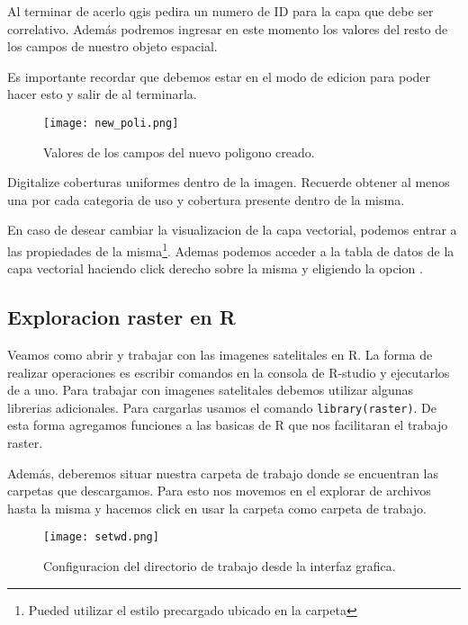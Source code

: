 Al terminar de acerlo qgis pedira un numero de ID para la capa que debe ser
correlativo. Además podremos ingresar en este momento los valores del resto de
los campos de nuestro objeto espacial.

Es importante recordar que debemos estar en el modo de edicion para poder hacer
esto y salir de al terminarla.

\begin{figure}[h!]
\begin{center}
    \texttt{[image: new\_poli.png]}
\end{center}
    \caption{Valores de los campos del nuevo poligono creado.}
    \label{fig:newpoli}
\end{figure}

\begin{act}
   Digitalize coberturas uniformes dentro de la imagen. Recuerde obtener al
   menos una por cada categoria de uso y cobertura presente dentro de la misma.
\end{act}

En caso de desear cambiar la visualizacion de la capa vectorial, podemos entrar
a las propiedades de la misma\footnote{Pueded utilizar el estilo precargado
ubicado en la carpeta }. Ademas podemos acceder a la tabla de
datos de la capa vectorial haciendo click derecho sobre la misma y eligiendo la
opcion .

\subsection{Exploracion raster en R}
Veamos como abrir y trabajar con las imagenes satelitales en R. La forma de
realizar operaciones es escribir comandos en la consola de R-studio y
ejecutarlos de a uno. Para trabajar con imagenes satelitales debemos utilizar
algunas librerias adicionales. Para cargarlas usamos el comando
\texttt{library(raster)}. De esta forma agregamos funciones a las basicas de
R que nos facilitaran el trabajo raster.

Además, deberemos situar nuestra carpeta de trabajo donde se encuentran las
carpetas que descargamos. Para esto nos movemos en el explorar de archivos
hasta la misma y hacemos click en usar la carpeta como carpeta de trabajo.

\begin{figure}[h!]
\begin{center}
    \texttt{[image: setwd.png]}
\end{center}
\caption{Configuracion del directorio de trabajo desde la interfaz grafica.}
\label{fig:setwd}
\end{figure}


